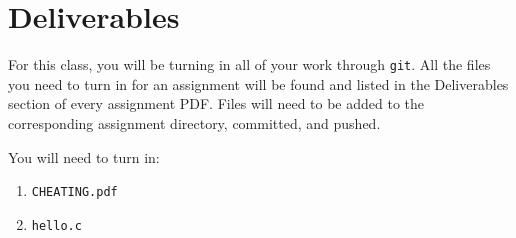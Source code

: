 \section{Deliverables}


\noindent For this class, you will be turning in all of your work through
\texttt{git}. All the files you need to turn in for an assignment will be found
and listed in the Deliverables section of every assignment PDF. Files will need
to be added to the corresponding assignment directory, committed, and pushed.

You will need to turn in:
\begin{enumerate}
	\item \texttt{CHEATING.pdf}
  \item \texttt{hello.c}
\end{enumerate}
